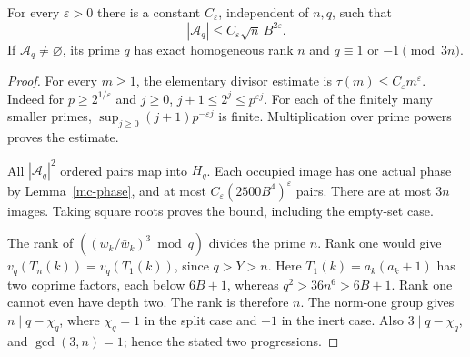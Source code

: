 \begin{theorem}\label{mc-count}
For every \(\varepsilon>0\) there is a constant \(C_\varepsilon\),
independent of \(n,q\), such that
\[
 |\mathcal{A}_q|\leq C_\varepsilon\sqrt n\,B^{2\varepsilon}.
\]
If \(\mathcal{A}_q\ne\varnothing\), its prime \(q\) has exact
homogeneous rank \(n\) and \(q\equiv1\) or \(-1\pmod{3n}\).
\end{theorem}
\begin{proof}
For every \(m\geq1\), the elementary divisor estimate is
\(\tau(m)\leq C_\varepsilon m^\varepsilon\).
Indeed for \(p\geq2^{1/\varepsilon}\) and \(j\geq0\),
\(j+1\leq2^j\leq p^{\varepsilon j}\).
For each of the finitely many smaller primes,
\(\sup_{j\geq0}(j+1)p^{-\varepsilon j}\) is finite. Multiplication
over prime powers proves the estimate.

All \(|\mathcal{A}_q|^2\) ordered pairs map into \(H_q\).
Each occupied image has one actual phase by Lemma~\ref{mc-phase},
and at most \(C_\varepsilon(2500B^4)^\varepsilon\) pairs.
There are at most \(3n\) images. Taking square roots proves the
bound, including the empty-set case.

The rank of \(((w_k/\bar w_k)^3\bmod q)\) divides the prime \(n\).
Rank one would give
\(v_q(T_n(k))=v_q(T_1(k))\), since \(q>Y>n\).
Here \(T_1(k)=a_k(a_k+1)\) has two coprime factors, each below
\(6B+1\), whereas \(q^2>36n^6>6B+1\). Rank one cannot even
have depth two. The rank is therefore \(n\).
The norm-one group gives \(n\mid q-\chi_q\), where
\(\chi_q=1\) in the split case and \(-1\) in the inert case.
Also \(3\mid q-\chi_q\), and \(\gcd(3,n)=1\); hence the stated
two progressions.
\end{proof}

